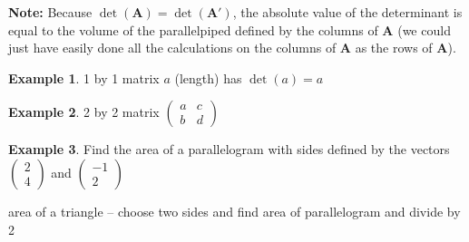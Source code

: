 \documentclass[
]{book}
\theoremstyle{definition}
\theoremstyle{definition}
\newtheorem{example}{Example}[chapter]
\theoremstyle{definition}
\theoremstyle{definition}
\theoremstyle{remark}
\begin{document}
\textbf{Note:} Because \(\det(\mathbf{A}) = \det(\mathbf{A}')\), the absolute value of the determinant is equal to the volume of the parallelpiped defined by the columns of \(\mathbf{A}\) (we could just have easily done all the calculations on the columns of \(\mathbf{A}\) as the rows of \(\mathbf{A}\)).

\begin{example}
1 by 1 matrix \(a\) (length) has \(\det(a) = a\)
\end{example}

\begin{example}
2 by 2 matrix \(\begin{pmatrix} a & c \\ b & d \end{pmatrix}\)
\end{example}

\begin{example}
Find the area of a parallelogram with sides defined by the vectors \(\begin{pmatrix} 2 \\ 4 \end{pmatrix}\) and \(\begin{pmatrix} -1 \\ 2 \end{pmatrix}\)
\end{example}

area of a triangle -- choose two sides and find area of parallelogram and divide by 2
\end{document}
